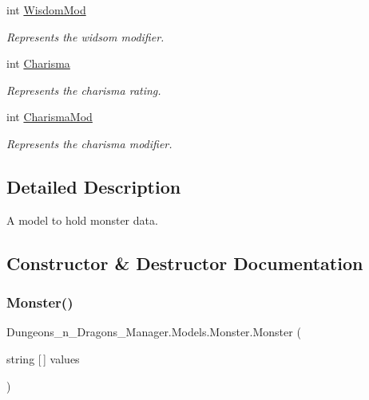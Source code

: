\begin{DoxyCompactItemize}
int \mbox{\hyperlink{class_dungeons__n___dragons___manager_1_1_models_1_1_monster_a2e9f29c5cb493bc8c3a38108a6824451}{Wisdom\+Mod}}
\begin{DoxyCompactList}\small\item\em Represents the widsom modifier. \end{DoxyCompactList}\item 
int \mbox{\hyperlink{class_dungeons__n___dragons___manager_1_1_models_1_1_monster_aecbd56f32cb7ef5e9502659a40cdbb01}{Charisma}}
\begin{DoxyCompactList}\small\item\em Represents the charisma rating. \end{DoxyCompactList}\item 
int \mbox{\hyperlink{class_dungeons__n___dragons___manager_1_1_models_1_1_monster_aba0ae70b2439dc55be7d176f952796bd}{Charisma\+Mod}}
\begin{DoxyCompactList}\small\item\em Represents the charisma modifier. \end{DoxyCompactList}\end{DoxyCompactItemize}


\subsection{Detailed Description}
A model to hold monster data. 



\subsection{Constructor \& Destructor Documentation}
\mbox{\label{class_dungeons__n___dragons___manager_1_1_models_1_1_monster_a104c2ce5cf5652cfbdc7fe2f5be0082e}} 
\subsubsection{\texorpdfstring{Monster()}{Monster()}}
{\footnotesize\ttfamily Dungeons\+\_\+n\+\_\+\+Dragons\+\_\+\+Manager.\+Models.\+Monster.\+Monster (\begin{DoxyParamCaption}\item[{string \mbox{[}$\,$\mbox{]}}]{values }\end{DoxyParamCaption})\hspace{0.3cm}{\ttfamily [inline]}}



